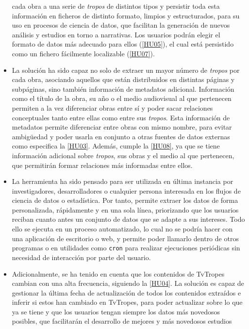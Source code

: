 \begin{itemize}
    cada obra a una serie de \textit{tropos} de distintos tipos y persistir toda
    esta información en ficheros de distinto formato, limpios y estructurados,
    para su uso en procesos de ciencia de datos, que facilitan la generación de
    nuevos análisis y estudios en torno a narrativas. Los usuarios podrán elegir
    el formato de datos más adecuado para ellos
    (\href{https://github.com/jlgallego99/TropesToGo/issues/30}{[HU05]}), el
    cual está persistido como un fichero fácilmente localizable
    (\href{https://github.com/jlgallego99/TropesToGo/issues/46}{[HU07]}).
    \item La solución ha sido capaz no solo de extraer un mayor número de
    \textit{tropos} por cada obra, asociando aquellos que están distribuidos en
    distintas páginas y subpáginas, sino también información de metadatos
    adicional. Información como el título de la obra, su año o el medio
    audiovisual al que pertenecen permiten a la vez diferenciar obras entre sí y
    poder sacar relaciones conceptuales tanto entre ellas como entre sus
    \textit{tropos}. Esta información de metadatos permite diferenciar entre
    obras con mismo nombre, para evitar ambigüedad y poder usarla en conjunto a
    otras fuentes de datos externas como especifica la
    \href{https://github.com/jlgallego99/TropesToGo/issues/8}{[HU03]}. Además,
    cumple la
    \href{https://github.com/jlgallego99/TropesToGo/issues/57}{[HU08]}, ya que
    se tiene información adicional sobre \textit{tropos}, sus obras y el medio
    al que pertenecen, que permitirán formar relaciones más informadas entre
    ellos.
    \item La herramienta ha sido pensado para ser utilizada en última instancia
    por investigadores, desarrolladores o cualquier persona interesada en los
    flujos de ciencia de datos o estadística. Por tanto, permite extraer los
    datos de forma personalizada, rápidamente y en una sola línea, priorizando
    que los usuarios reciban cuanto antes un conjunto de datos que se adapte a
    sus intereses. Todo ello se ejecuta en un proceso automatizado, lo cual no se
    podría hacer con una aplicación de escritorio o web, y permite poder
    llamarlo dentro de otros programas o en utilidades como \texttt{cron} para
    realizar ejecuciones periódicas sin necesidad de interacción por parte del usuario. 
    \item Adicionalmente, se ha tenido en cuenta que los contenidos de TvTropes
    cambian con una alta frecuencia, siguiendo la
    \href{https://github.com/jlgallego99/TropesToGo/issues/9}{[HU04]}. La
    solución es capaz de gestionar la última fecha de actualización de todos los
    contenidos extraídos e inferir si estos han cambiado en TvTropes, para poder
    actualizar sobre lo que ya se tiene y que los usuarios tengan siempre los
    datos más novedosos posibles, que facilitarán el desarrollo de mejores y más
    novedosos estudios
\end{itemize}

